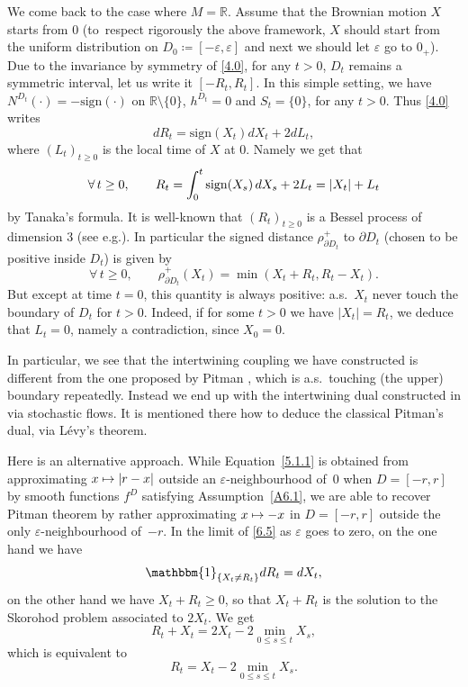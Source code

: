 \documentclass[10pt]{amsart}
\let\epsilon\varepsilon
\let\backslash\setminus
\newcommand\mto{\mathchoice{\longmapsto}{\mapsto}{\mapsto}{\mapsto}}
\theoremstyle{plain}
\theoremstyle{definition}
\newcommand{\RR}{{\mathbb R}}
\newcommand\df{\coloneqq}
\newcommand{\sign}{\mathrm{sign}}
\newcommand{\bq}{\begin{equation*}}
\newcommand{\eq}{\end{equation*}}
\newcommand{\fo}{\forall\,}
\newcommand{\un}{\mathbbm{1}}
\let\e\varepsilon
\providecommand{\eg}{e.g.}\providecommand{\ie}{i.e.}\providecommand{\resp}{resp.}\let\Subsection\subsection
\begin{document}
{We come back to} the case where $M=\RR$. Assume that the Brownian motion $X$ starts from 0
(to~respect rigorously the above framework, $X$ should start from the uniform distribution on $D_0\df[-\epsilon,\epsilon]$
and next we should let $\epsilon$ go to $0_+$).
Due to the invariance by symmetry of \eqref{4.0}, for any $t>0$, $D_t$ remains a symmetric interval, let us write it $[-R_t,R_t]$.
In this simple setting, we have $N^{D_t}(\cdot)=-\sign(\cdot)$ on $\RR\backslash{\{0\}}$, $h^{D_t}=0$ and $S_t=\{0\}$, for any $t>0$.
Thus {\eqref{4.0}} writes
\begin{equation}
\label{5.1.1}
dR_t=\sign(X_t)dX_t+2dL_t,
\end{equation}
where $(L_t)_{t\geq 0}$ is the local time of $X$ at 0.
Namely we get that
\bq
\fo t\geq 0,\qquad R_t=\int_0^t\sign(X_s)\,dX_s+2L_t\\
=\vert X_t\vert +L_t
\eq
by Tanaka's formula.
It is well-known that $(R_t)_{t\geq 0}$ is a Bessel process of dimension 3 (see \eg \cite[Chap.\,6, Cor.\,3.8]{MR1725357}).
In particular the signed distance $\rho^+_{\partial D_t}$ to $\partial D_t$ (chosen to be positive inside $D_t$) is given by
\bq
\fo t\geq 0,\qquad \rho^+_{\partial D_t}(X_t)=\min(X_t+R_t, R_t-X_t).\eq
But except at time $t=0$, this quantity is always positive: a.s.\ $X_t$ never touch the boundary of $D_t$ for $t>0$.
Indeed, if for some $t>0$ we have $\vert X_t\vert =R_t$, we deduce that $L_t=0$, namely a contradiction, since $X_0=0$.
\par
In particular, we see that the intertwining coupling we have constructed is different from the one proposed by Pitman \cite{MR0375485},
which is a.s.\ touching (the upper) boundary repeatedly. {Instead we end up with the intertwining dual constructed in \cite{Mic2020} via stochastic flows.
It is mentioned there how to deduce the classical Pitman's dual, via Lévy's theorem.}

Here is an alternative approach.
While Equation~\eqref{5.1.1} is obtained from approximating $x\mto |r-x|$ outside an $\e$-neighbourhood of~$0$ when $D=[-r,r]$ by smooth functions $f^D$ satisfying Assumption~\ref{A6.1},
we are able to recover Pitman theorem by rather approximating $x\mto -x$ in $D=[-r,r]$ outside the only $\e$-neighbourhood of~$-r$.
In the limit of \eqref{6.5} as $\epsilon$ goes to zero, on the one hand we have
\begin{equation}
\un_{\left\{X_t\not=R_t\right\}}dR_t=dX_t,
\end{equation}
on the other hand we have $X_t+R_t\ge 0$, so that $X_t+R_t$ is the solution to the Skorohod problem associated to $2X_t$.
We get
\begin{equation}
R_t+X_t=2X_t-2\min_{0\le s\le t}X_s,
\end{equation}
which is equivalent to
\begin{equation}
R_t=X_t-2\min_{0\le s\le t}X_s.
\end{equation}
\end{document}
